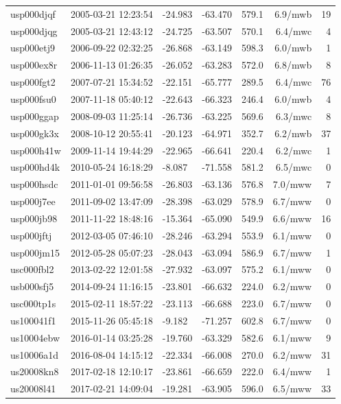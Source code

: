 \documentclass[10pt]{article}
\begin{document}
\begin{longtable}{llllrrr}
usp000djqf & 2005-03-21 12:23:54 & -24.983 & -63.470 & 579.1 & 6.9/mwb & 19 \\
usp000djqg & 2005-03-21 12:43:12 & -24.725 & -63.507 & 570.1 & 6.4/mwc & 4 \\
usp000etj9 & 2006-09-22 02:32:25 & -26.868 & -63.149 & 598.3 & 6.0/mwb & 1 \\
usp000ex8r & 2006-11-13 01:26:35 & -26.052 & -63.283 & 572.0 & 6.8/mwb & 8 \\
usp000fgt2 & 2007-07-21 15:34:52 & -22.151 & -65.777 & 289.5 & 6.4/mwc & 76 \\
usp000fsu0 & 2007-11-18 05:40:12 & -22.643 & -66.323 & 246.4 & 6.0/mwb & 4 \\
usp000ggap & 2008-09-03 11:25:14 & -26.736 & -63.225 & 569.6 & 6.3/mwc & 8 \\
usp000gk3x & 2008-10-12 20:55:41 & -20.123 & -64.971 & 352.7 & 6.2/mwb & 37 \\
usp000h41w & 2009-11-14 19:44:29 & -22.965 & -66.641 & 220.4 & 6.2/mwc & 1 \\
usp000hd4k & 2010-05-24 16:18:29 & -8.087 & -71.558 & 581.2 & 6.5/mwc & 0 \\
usp000hsdc & 2011-01-01 09:56:58 & -26.803 & -63.136 & 576.8 & 7.0/mww & 7 \\
usp000j7ee & 2011-09-02 13:47:09 & -28.398 & -63.029 & 578.9 & 6.7/mww & 0 \\
usp000jb98 & 2011-11-22 18:48:16 & -15.364 & -65.090 & 549.9 & 6.6/mww & 16 \\
usp000jftj & 2012-03-05 07:46:10 & -28.246 & -63.294 & 553.9 & 6.1/mww & 0 \\
usp000jm15 & 2012-05-28 05:07:23 & -28.043 & -63.094 & 586.9 & 6.7/mww & 1 \\
usc000fbl2 & 2013-02-22 12:01:58 & -27.932 & -63.097 & 575.2 & 6.1/mww & 0 \\
usb000sfj5 & 2014-09-24 11:16:15 & -23.801 & -66.632 & 224.0 & 6.2/mww & 0 \\
usc000tp1s & 2015-02-11 18:57:22 & -23.113 & -66.688 & 223.0 & 6.7/mww & 0 \\
us100041f1 & 2015-11-26 05:45:18 & -9.182 & -71.257 & 602.8 & 6.7/mww & 0 \\
us10004ebw & 2016-01-14 03:25:28 & -19.760 & -63.329 & 582.6 & 6.1/mww & 9 \\
us10006a1d & 2016-08-04 14:15:12 & -22.334 & -66.008 & 270.0 & 6.2/mww & 31 \\
us20008kn8 & 2017-02-18 12:10:17 & -23.861 & -66.659 & 222.0 & 6.4/mww & 1 \\
us20008l41 & 2017-02-21 14:09:04 & -19.281 & -63.905 & 596.0 & 6.5/mww & 33 \\

\end{longtable}
\end{document}
